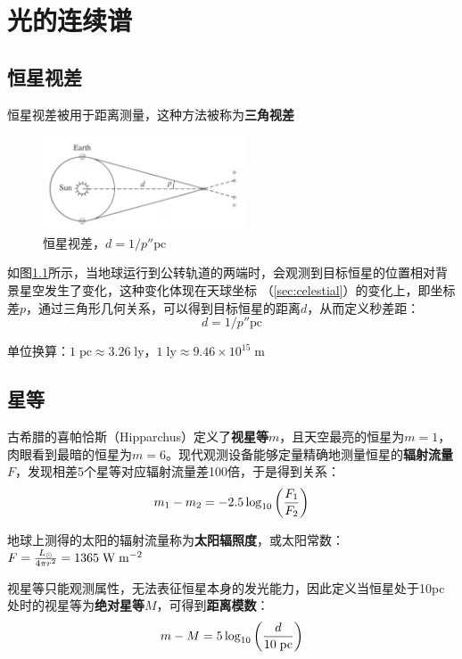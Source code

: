 \documentclass[openany]{ctexbook}
\begin{document}
\chapter{光的连续谱}
\section{恒星视差}
恒星视差被用于距离测量，这种方法被称为{\bf 三角视差}

\begin{figure}[hbt]
  \centering
  \includegraphics[width=6cm]{chapters/03/parallax}
  \caption{恒星视差，$d=1/p''\mathrm{pc}$}
  \label{fig:parallax}
\end{figure}

如图\ref{fig:parallax}所示，当地球运行到公转轨道的两端时，会观测到目标恒星的位置相对背景星空发生了变化，这种变化体现在天球坐标
（\autoref{sec:celestial}）的变化上，即坐标差$p$，通过三角形几何关系，可以得到目标恒星的距离$d$，从而定义秒差距：
\begin{equation}
  d=1/p''\mathrm{pc}
\end{equation}

单位换算：$1\;\mathrm{pc}\approx
3.26\;\mathrm{ly}$，$1\;\mathrm{ly}\approx9.46\times10^{15}\;\mathrm m$

\section{星等}
古希腊的喜帕恰斯（Hipparchus）定义了{\bf 视星等}$m$，且天空最亮的恒星为$m=1$，肉眼看到最暗的恒星为$m=6$。现代观测设备能够定量精确地测量恒星的{\bf 辐射流量}$F$，发现相差5个星等对应辐射流量差100倍，于是得到关系：
\begin{equation}
  m_1-m_2=-2.5\log_{10}\left({F_1\over F_2}\right)
  \label{eq:magnitude}
\end{equation}

地球上测得的太阳的辐射流量称为{\bf 太阳辐照度}，或太阳常数：$F={L_\odot \over 4\pi r^2}=1365\;\mathrm{W\;m^{-2}}$

视星等只能观测属性，无法表征恒星本身的发光能力，因此定义当恒星处于10pc处时的视星等为{\bf 绝对星等}$M$，可得到{\bf 距离模数}：
\begin{equation}
  m-M=5\log_{10}\left({d\over 10\;\mathrm{pc}}\right)
  \label{eq:module}
\end{equation}
\end{document}

